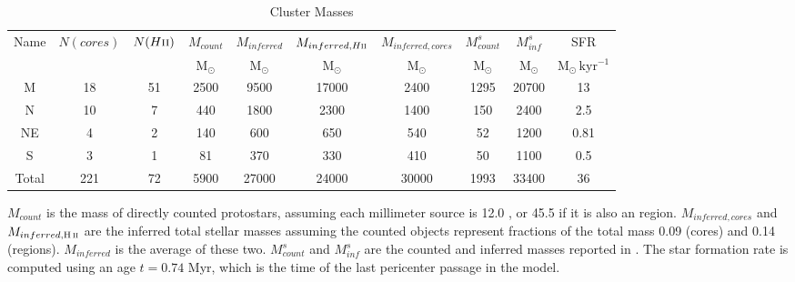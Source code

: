 \begin{table*}[htp]
\centering
\caption{Cluster Masses}
\begin{tabular}{cccccccccc}
\label{tab:clustermassestimates}
Name & $N(cores)$ & $N(H\textsc{ii})$ & $M_{count}$ & $M_{inferred}$ & $M_{inferred, H\textsc{ii}}$ & $M_{inferred, cores}$ & $M_{count}^s$ & $M_{inf}^s$ & SFR \\
 &  &  & $\mathrm{M_{\odot}}$ & $\mathrm{M_{\odot}}$ & $\mathrm{M_{\odot}}$ & $\mathrm{M_{\odot}}$ & $\mathrm{M_{\odot}}$ & $\mathrm{M_{\odot}}$ & $\mathrm{M_{\odot}\,kyr^{-1}}$ \\
\hline
M & 18 & 51 & 2500 & 9500 & 17000 & 2400 & 1295 & 20700 & 13 \\
N & 10 & 7 & 440 & 1800 & 2300 & 1400 & 150 & 2400 & 2.5 \\
NE & 4 & 2 & 140 & 600 & 650 & 540 & 52 & 1200 & 0.81 \\
S & 3 & 1 & 81 & 370 & 330 & 410 & 50 & 1100 & 0.5 \\
Total & 221 & 72 & 5900 & 27000 & 24000 & 30000 & 1993 & 33400 & 36 \\
\hline
\end{tabular}
\par
$M_{count}$ is the mass of directly counted protostars, assuming each millimeter source is 12.0 \msun, or 45.5 \msun if it is also an \hii region.  $M_{inferred,cores}$ and $M_{inferred,\hii}$ are the inferred total stellar masses assuming the counted objects represent fractions of the total mass 0.09 (cores) and 0.14 (\hii regions).  $M_{inferred}$ is the average of these two.  $M_{count}^s$ and $M_{inf}^s$ are the counted and inferred masses reported in \citet{Schmiedeke2016a}.  The star formation rate is computed using an age $t=0.74$ Myr, which is the time of the last pericenter passage in the \citet{Kruijssen2015a} model.  
\end{table*}
